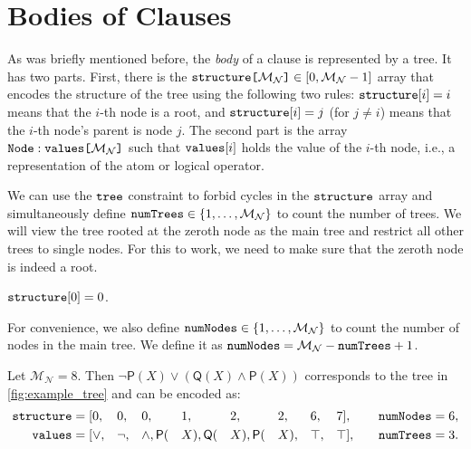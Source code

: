 \documentclass[runningheads]{llncs}
\newcommand{\variable}[1]{\texttt{\textup{#1}}}
\newcommand{\arrayd}[3]{\variable{{#1}[}{#2}\variable{]} \in {#3}}
\newcommand{\arrayt}[3]{\variable{{#3}} : \variable{{#1}[}{#2}\variable{]}}
\newcommand{\maxNumNodes}{\mathcal{M}_{\mathcal{N}}}
\begin{document}
\section{Bodies of Clauses} \label{sec:bodies}

As was briefly mentioned before, the \emph{body} of a clause is represented by a
tree. It has two parts. First, there is the
$\arrayd{structure}{\maxNumNodes{}}{[0, \maxNumNodes{} - 1]}$ array that encodes
the structure of the tree using the following two rules:
$\variable{structure}[i] = i$ means that the $i$-th node is a root, and
$\variable{structure}[i] = j$ (for $j \ne i$) means that the $i$-th node's
parent is node $j$. The second part is the array
$\arrayt{values}{\maxNumNodes{}}{Node}$ such that $\variable{values}[i]$ holds
the value of the $i$-th node, i.e., a representation of the atom or logical
operator.

We can use the $\variable{tree}$ constraint \cite{DBLP:conf/cp/FagesL11} to
forbid cycles in the $\variable{structure}$ array and simultaneously define
$\variable{numTrees} \in \{ 1, \dots, \maxNumNodes{} \}$ to count the number of
trees. We will view the tree rooted at the zeroth node as the main tree and
restrict all other trees to single nodes. For this to work, we need to make sure
that the zeroth node is indeed a root.
\begin{constraint}
  $\variable{structure}[0] = 0$.
\end{constraint}
For convenience, we also define $\variable{numNodes} \in \{ 1, \dots,
\maxNumNodes{} \}$ to count the number of nodes in the main tree. We define it
as $\variable{numNodes} = \maxNumNodes{} - \variable{numTrees} + 1$.

\begin{example} \label{example:formula}
  Let $\maxNumNodes{} = 8$. Then $\neg\mathsf{P}(X) \lor (\mathsf{Q}(X) \land
  \mathsf{P}(X))$ corresponds to the tree in \cref{fig:example_tree} and can be
  encoded as:
  \begin{alignat*}{9}
    \variable{structure} &= [0, &&0, &&0, &&1, &&2, &&2, &&6, &&7], \quad
    &&\variable{numNodes} = 6, \\
    \variable{values} &= [{\lor}, &&{\neg}, &&{\land}, \mathsf{P}(&&X),
    \mathsf{Q}(&&X), \mathsf{P}(&&X), &&\top, &&\top], \quad
    &&\variable{numTrees} = 3.
  \end{alignat*}
\end{example}
\end{document}
